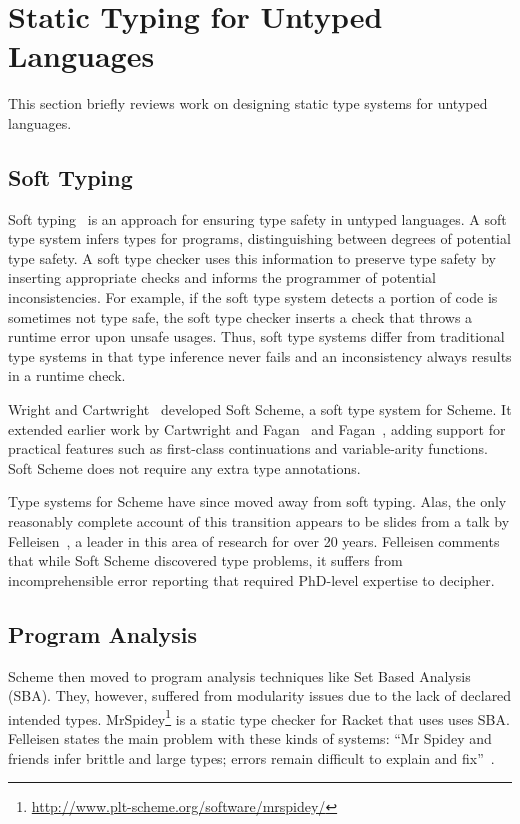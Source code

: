 \section{Static Typing for Untyped Languages}

This section briefly reviews work on designing static type systems for untyped languages.

\subsection{Soft Typing}

Soft typing~\cite{CF91}
is an approach for ensuring type safety in untyped languages.
A soft type system infers types for programs, distinguishing between degrees
of potential type safety.
A soft type checker uses this information to 
preserve type safety by inserting appropriate checks 
and informs the programmer of potential inconsistencies.
For example, if the soft type system detects a portion of code is sometimes not type safe,
the soft type checker inserts a check that throws a runtime error upon unsafe usages.
Thus, soft type systems differ from traditional type systems in that type inference 
never fails and an inconsistency always results in a runtime check.

Wright and Cartwright~\cite{WC97} developed Soft Scheme, a
soft type system for Scheme. 
It extended earlier work by Cartwright and Fagan~\cite{CF91}
and Fagan~\cite{Fag91}, adding support for practical features such as
first-class continuations and variable-arity functions.
Soft Scheme does not require any extra type annotations.

Type systems for Scheme have since moved away from soft typing.
Alas, the only reasonably complete account of this transition 
appears to be slides from a talk by Felleisen~\cite{Fell09},
a leader in this area of research for over 20 years.
Felleisen comments that while Soft Scheme discovered type problems, 
it suffers from incomprehensible
error reporting that required PhD-level expertise to decipher. 

\subsection{Program Analysis}

Scheme then moved to program analysis techniques like Set Based Analysis (SBA).
They, however, suffered from modularity issues due to the lack of declared intended types.
MrSpidey\footnote{\url{http://www.plt-scheme.org/software/mrspidey/}}
is a static type checker for Racket that uses uses SBA.
Felleisen states the main problem with these kinds of systems: ``Mr Spidey and friends infer brittle and large
types; errors remain difficult to explain and fix''~\cite{Fell09}.

